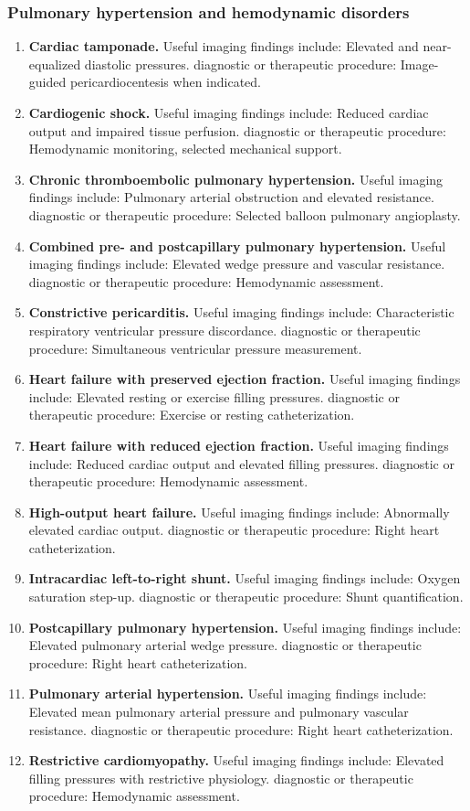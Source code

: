 \subsubsection{Pulmonary hypertension and hemodynamic disorders}
\begin{enumerate}[leftmargin=*,itemsep=0.45em,topsep=0.4em]
\item \textbf{Cardiac tamponade.} Useful imaging findings include: Elevated and near-equalized diastolic pressures. diagnostic or therapeutic procedure: Image-guided pericardiocentesis when indicated.
\item \textbf{Cardiogenic shock.} Useful imaging findings include: Reduced cardiac output and impaired tissue perfusion. diagnostic or therapeutic procedure: Hemodynamic monitoring, selected mechanical support.
\item \textbf{Chronic thromboembolic pulmonary hypertension.} Useful imaging findings include: Pulmonary arterial obstruction and elevated resistance. diagnostic or therapeutic procedure: Selected balloon pulmonary angioplasty.
\item \textbf{Combined pre- and postcapillary pulmonary hypertension.} Useful imaging findings include: Elevated wedge pressure and vascular resistance. diagnostic or therapeutic procedure: Hemodynamic assessment.
\item \textbf{Constrictive pericarditis.} Useful imaging findings include: Characteristic respiratory ventricular pressure discordance. diagnostic or therapeutic procedure: Simultaneous ventricular pressure measurement.
\item \textbf{Heart failure with preserved ejection fraction.} Useful imaging findings include: Elevated resting or exercise filling pressures. diagnostic or therapeutic procedure: Exercise or resting catheterization.
\item \textbf{Heart failure with reduced ejection fraction.} Useful imaging findings include: Reduced cardiac output and elevated filling pressures. diagnostic or therapeutic procedure: Hemodynamic assessment.
\item \textbf{High-output heart failure.} Useful imaging findings include: Abnormally elevated cardiac output. diagnostic or therapeutic procedure: Right heart catheterization.
\item \textbf{Intracardiac left-to-right shunt.} Useful imaging findings include: Oxygen saturation step-up. diagnostic or therapeutic procedure: Shunt quantification.
\item \textbf{Postcapillary pulmonary hypertension.} Useful imaging findings include: Elevated pulmonary arterial wedge pressure. diagnostic or therapeutic procedure: Right heart catheterization.
\item \textbf{Pulmonary arterial hypertension.} Useful imaging findings include: Elevated mean pulmonary arterial pressure and pulmonary vascular resistance. diagnostic or therapeutic procedure: Right heart catheterization.
\item \textbf{Restrictive cardiomyopathy.} Useful imaging findings include: Elevated filling pressures with restrictive physiology. diagnostic or therapeutic procedure: Hemodynamic assessment.
\end{enumerate}

